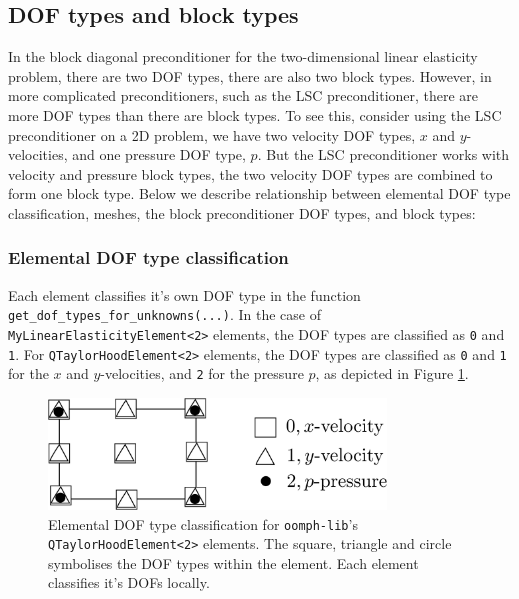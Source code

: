 \subsection{DOF types and block types\label{sec:dof_types_and_block_types}}
In the block diagonal preconditioner for the two-dimensional linear elasticity 
problem, there are two DOF types, there are also two block types. However, in 
more complicated preconditioners, such as the LSC preconditioner, there are 
more DOF types than there are block types. To see this, consider  using the 
LSC preconditioner on a 2D problem, we have two velocity DOF types, $x$ and 
$y$-velocities, and one pressure DOF type, $p$. But the LSC preconditioner 
works with velocity and pressure block types, the two velocity DOF types are 
combined to form one block type. Below we describe relationship between 
elemental DOF type classification, meshes, the block preconditioner DOF types, 
and block types:


\subsubsection{Elemental DOF type classification}

Each element classifies it's own DOF type in the function 
\texttt{get\_\allowbreak dof\_\allowbreak types\_\allowbreak for\_\allowbreak unknowns(...)}. In the case of 
\texttt{My\allowbreak Linear\allowbreak Elasticity\allowbreak Element<2>} elements, the DOF types are classified as 
\texttt{0} and \texttt{1}. For \texttt{Q\allowbreak TaylorHood\allowbreak Element<2>} 
elements, the DOF types are classified as \texttt{0} and \texttt{1} for the $x$
and $y$-velocities, and \texttt{2} for the pressure $p$, as depicted in Figure \ref{fig:2DTH_DOF_classification}.
\begin{figure}[H]
\centering
\includegraphics[width=0.8\textwidth]{./pic/taylorhood_dof_classification.pdf}
\caption{Elemental DOF type classification for \texttt{oomph-\allowbreak lib}'s
  \texttt{Q\allowbreak TaylorHood\allowbreak Element<2>} elements. The square,
  triangle and circle symbolises the DOF types within the element. Each element
  classifies it's DOFs locally.}
\label{fig:2DTH_DOF_classification}
\end{figure}

